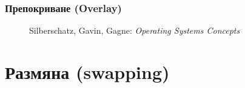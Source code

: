 \documentclass[ignorenonframetext, hyperref=unicode]{beamer}
\begin{document}
\begin{frame}
\frametitle{Препокриване (Overlay)}
\begin{figure}[h]
\center
{}
\caption{Silberschatz, Gavin, Gagne: {\em Operating Systems Concepts}}
\end{figure}
\end{frame}


\section{Размяна (swapping)}

\end{document}
